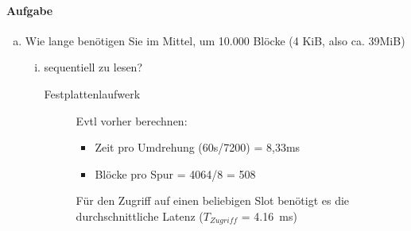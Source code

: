 \paragraph{Aufgabe}
\begin{enumerate}[a)]
	\item Wie lange benötigen Sie im Mittel, um 10.000 Blöcke (4 KiB, also ca. 39MiB)
	\label{ZugriffFestplattenDauern}

	\begin{enumerate}[i)]
		\item sequentiell zu lesen?

		\begin{solution}
			\begin{description}
				\item[Festplattenlaufwerk]
				\begin{note}
					Evtl vorher berechnen:
					\begin{itemize}
						\item Zeit pro Umdrehung (60s/7200) = 8,33ms
						\item Blöcke pro Spur = 4064/8 = 508
					\end{itemize}
				\end{note}
				Für den Zugriff auf einen beliebigen Slot benötigt es die durchschnittliche Latenz ($T_{Zugriff}$ = 4.16~ms)


\end{description}
\end{solution}
\end{enumerate}
\end{enumerate}
